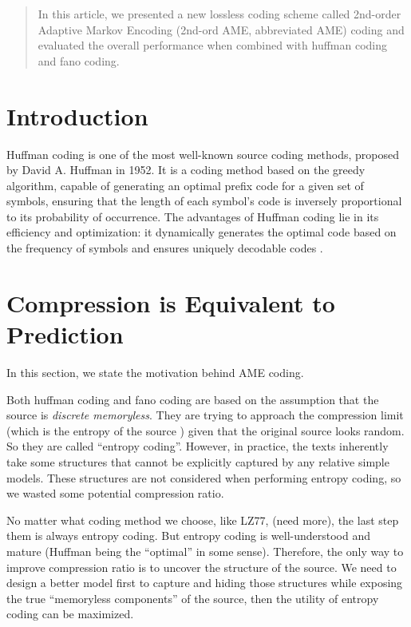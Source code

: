 \documentclass[12pt,twoside]{article}
\begin{document}
\tableofcontents


\listoffigures
\listoftables
\newpage

\begin{abstract}
    In this article, we presented a new lossless coding scheme called 2nd-order Adaptive Markov Encoding (2nd-ord AME, abbreviated AME) coding and evaluated the overall performance when combined with huffman coding and fano coding.
\end{abstract}

\section{Introduction}
Huffman coding is one of the most well-known source coding methods, proposed by David A. Huffman in 1952. It is a coding method based on the greedy algorithm, capable of generating an optimal prefix code for a given set of symbols, ensuring that the length of each symbol’s code is inversely proportional to its probability of occurrence. The advantages of Huffman coding lie in its efficiency and optimization: it dynamically generates the optimal code based on the frequency of symbols and ensures uniquely decodable codes \cite{ref2, ref3}.

\section{Compression is Equivalent to Prediction}

In this section, we state the motivation behind AME coding. 

Both huffman coding and fano coding are based on the assumption that the source is \textit{discrete memoryless}. They are trying to approach the compression limit (which is the entropy of the source \cite{ref1}) given that the original source looks random. So they are called ``entropy coding''. However, in practice, the texts inherently take some structures that cannot be explicitly captured by any relative simple models. These structures are not considered when performing entropy coding, so we wasted some potential compression ratio.

No matter what coding method we choose, like LZ77, (need more), the last step them is always entropy coding. But entropy coding is well-understood and mature (Huffman being the ``optimal'' in some sense). Therefore, the only way to improve compression ratio is to uncover the structure of the source. We need to design a better model first to capture and hiding those structures while exposing the true ``memoryless components'' of the source, then the utility of entropy coding can be maximized.
\end{document}

